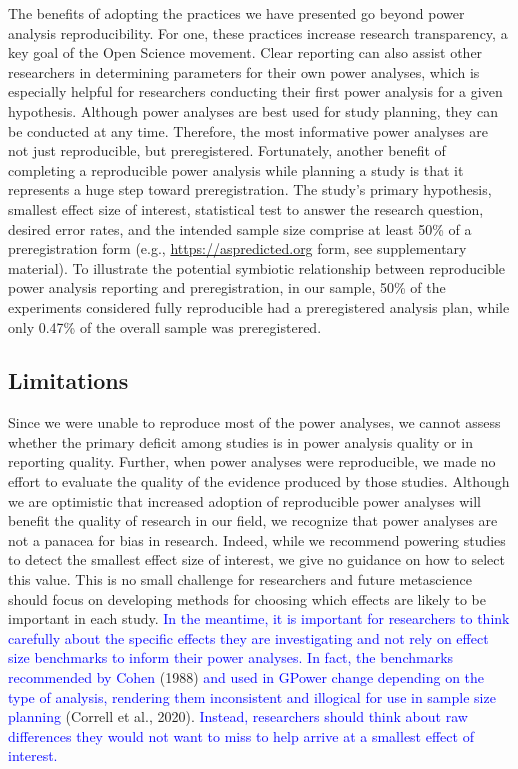 \documentclass[
  man, donotrepeattitle,mask,floatsintext]{apa7}
\begin{document}
The benefits of adopting the practices we have presented go beyond power analysis reproducibility. For one, these practices increase research transparency, a key goal of the Open Science movement. Clear reporting can also assist other researchers in determining parameters for their own power analyses, which is especially helpful for researchers conducting their first power analysis for a given hypothesis. Although power analyses are best used for study planning, they can be conducted at any time. Therefore, the most informative power analyses are not just reproducible, but preregistered. Fortunately, another benefit of completing a reproducible power analysis while planning a study is that it represents a huge step toward preregistration. The study's primary hypothesis, smallest effect size of interest, statistical test to answer the research question, desired error rates, and the intended sample size comprise at least 50\% of a preregistration form (e.g., \url{https://aspredicted.org} form, see supplementary material). To illustrate the potential symbiotic relationship between reproducible power analysis reporting and preregistration, in our sample, 50\% of the experiments considered fully reproducible had a preregistered analysis plan, while only 0.47\% of the overall sample was preregistered.

\hypertarget{limitations}{%
\subsection{Limitations}\label{limitations}}

Since we were unable to reproduce most of the power analyses, we cannot assess whether the primary deficit among studies is in power analysis quality or in reporting quality. Further, when power analyses were reproducible, we made no effort to evaluate the quality of the evidence produced by those studies. Although we are optimistic that increased adoption of reproducible power analyses will benefit the quality of research in our field, we recognize that power analyses are not a panacea for bias in research. Indeed, while we recommend powering studies to detect the smallest effect size of interest, we give no guidance on how to select this value. This is no small challenge for researchers and future metascience should focus on developing methods for choosing which effects are likely to be important in each study. \textcolor{blue}{In the meantime, it is important for researchers to think carefully about the specific effects they are investigating and not rely on effect size benchmarks to inform their power analyses. In fact, the benchmarks recommended by Cohen} (1988) \textcolor{blue}{and used in G\*Power change depending on the type of analysis, rendering them inconsistent and illogical for use in sample size planning} (Correll et al., 2020). \textcolor{blue}{Instead, researchers should think about raw differences they would not want to miss to help arrive at a smallest effect of interest.}
\end{document}
